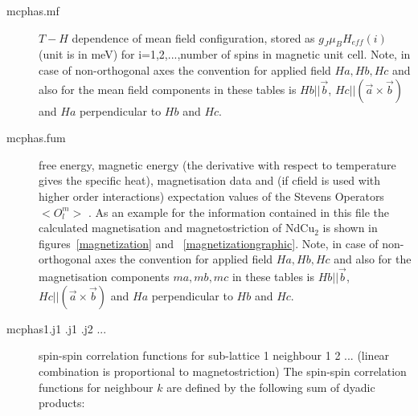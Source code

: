 \begin{description}
\item [\prg mcphas.mf]     $T-H$ dependence of mean field configuration, stored as $g_J \mu_B H_{eff}(i)$(unit is in meV)
                            for i=1,2,...,number of spins in magnetic unit cell.
                            Note, in case of non-orthogonal axes the convention for applied field $Ha, Hb,Hc$ and
                            also for the mean field components in these tables 
                            is $Hb||\vec b$, $Hc||(\vec a \times \vec b)$ and $Ha$ perpendicular to $Hb$ and $Hc$.
\item [\prg mcphas.fum]    free energy, magnetic energy (the derivative with respect to temperature gives the specific %
heat),
                           magnetisation data and (if cfield is used with higher order interactions)
                           expectation values of the Stevens Operators $<O_l^m>$ . As an example for the information
			   contained in this file the calculated magnetisation and magnetostriction of NdCu$_2$ is shown in
			   figures~\ref{magnetization} and ~\ref{magnetizationgraphic}.
                            Note, in case of non-orthogonal axes the convention for applied field $Ha, Hb,Hc$ and
                            also for the magnetisation components $ma,mb,mc$ in these tables 
                            is $Hb||\vec b$, $Hc||(\vec a \times \vec b)$ and $Ha$ perpendicular to $Hb$ and $Hc$.

\item [\prg mcphas1.j1 .j1 .j2 ...] 
               spin-spin correlation functions for sub-lattice 1 neighbour 1 2 ...
	       (linear combination is proportional to magnetostriction)
	       The spin-spin correlation functions for neighbour $k$ are defined by
	       the following sum of dyadic products:


\end{description}

